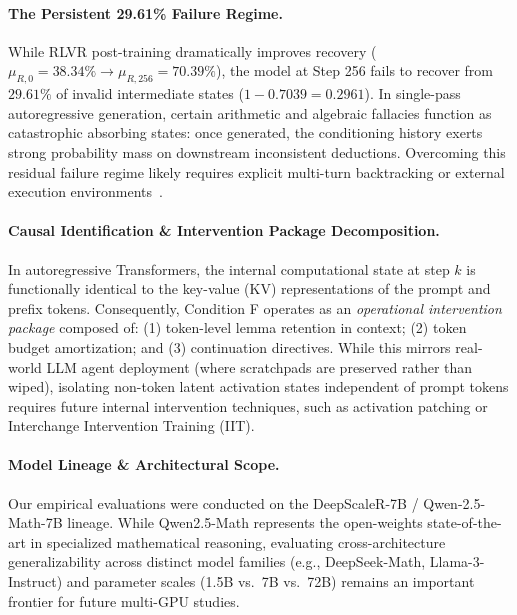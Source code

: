 \documentclass[11pt]{article}
\begin{document}
\paragraph{The Persistent 29.61\% Failure Regime.}
While RLVR post-training dramatically improves recovery ($\mu_{R,0}=38.34\% \to \mu_{R,256}=70.39\%$), the model at Step 256 fails to recover from $29.61\%$ of invalid intermediate states ($1 - 0.7039 = 0.2961$). In single-pass autoregressive generation, certain arithmetic and algebraic fallacies function as catastrophic absorbing states: once generated, the conditioning history exerts strong probability mass on downstream inconsistent deductions. Overcoming this residual failure regime likely requires explicit multi-turn backtracking or external execution environments~\cite{Kumar2024Training}.

\paragraph{Causal Identification \& Intervention Package Decomposition.}
In autoregressive Transformers, the internal computational state at step $k$ is functionally identical to the key-value (KV) representations of the prompt and prefix tokens. Consequently, Condition F operates as an \emph{operational intervention package} composed of: (1) token-level lemma retention in context; (2) token budget amortization; and (3) continuation directives. While this mirrors real-world LLM agent deployment (where scratchpads are preserved rather than wiped), isolating non-token latent activation states independent of prompt tokens requires future internal intervention techniques, such as activation patching or Interchange Intervention Training (IIT).

\paragraph{Model Lineage \& Architectural Scope.}
Our empirical evaluations were conducted on the DeepScaleR-7B / Qwen-2.5-Math-7B lineage. While Qwen2.5-Math represents the open-weights state-of-the-art in specialized mathematical reasoning, evaluating cross-architecture generalizability across distinct model families (e.g., DeepSeek-Math, Llama-3-Instruct) and parameter scales (1.5B vs.\ 7B vs.\ 72B) remains an important frontier for future multi-GPU studies.
\end{document}
